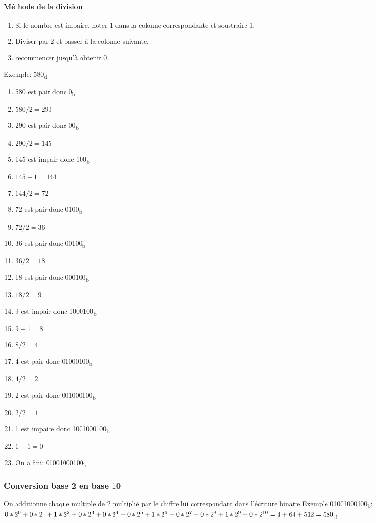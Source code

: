 \documentclass[10pt,a4paper]{article}
\begin{document}
 \paragraph{Méthode de la division}
 \begin{enumerate}
	 \item Si le nombre est impaire, noter 1 dans la colonne correspondante et soustraire 1.
	 \item Diviser par 2 et passer à la colonne suivante.
	 \item recommencer jusqu'à obtenir 0.
 \end{enumerate}
 Exemple: 580\textsubscript{d}
 \begin{enumerate}
	 \item 580 est pair donc 0\textsubscript{b}
	 \item $580/2 = 290$
	 \item 290 est pair donc 00\textsubscript{b}
	 \item $290/2 = 145$
	 \item 145 est impair donc 100\textsubscript{b}
	 \item $145-1 = 144$
	 \item $144/2 = 72$
	 \item 72 est pair donc  0100\textsubscript{b}
	 \item $72/2 = 36$
	 \item 36 est pair donc 00100\textsubscript{b}
	 \item $36/2 = 18$
	 \item 18 est pair donc 000100\textsubscript{b}
	 \item $18/2 = 9$
	 \item 9 est impair donc 1000100\textsubscript{b}
	 \item $9-1 = 8$
	 \item $8/2 = 4$
	 \item 4 est pair donc 01000100\textsubscript{b}
	 \item $4/2 = 2$
	 \item 2 est pair donc 001000100\textsubscript{b}
	 \item $2/2 = 1$
	 \item 1 est impaire donc 1001000100\textsubscript{b}
	 \item $1-1 = 0$
	 \item On a fini: 01001000100\textsubscript{b}
 \end{enumerate}

 \subsubsection{Conversion base 2 en base 10}
 On additionne chaque multiple de 2 multiplié par le chiffre lui correspondant dans l'écriture binaire
 Exemple 01001000100\textsubscript{b}:\\
 $0*2^0 + 0*2^1 + 1*2^2 + 0*2^3 +0*2^4 +0*2^5 + 1*2^6 + 0*2^7 +0*2^8 + 1*2^9 + 0*2^{10} \\= 4 + 64 + 512 = 580$\textsubscript{d}
\end{document}
